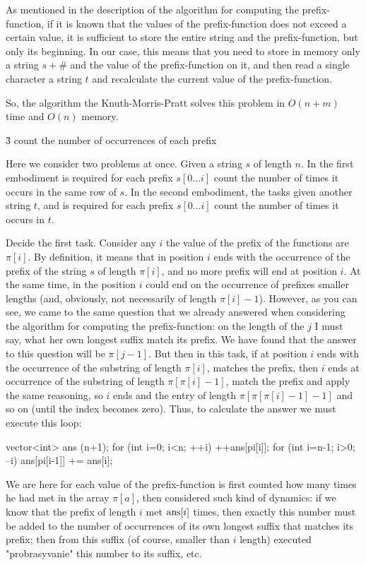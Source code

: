 As mentioned in the description of the algorithm for computing the prefix-function, if it is known that the values of the prefix-function does not exceed a certain value, it is sufficient to store the entire string and the prefix-function, but only its beginning. In our case, this means that you need to store in memory only a string $s + \#$ and the value of the prefix-function on it, and then read a single character a string $t$ and recalculate the current value of the prefix-function.

So, the algorithm the Knuth-Morris-Pratt solves this problem in $O(n+m)$ time and $O(n)$ memory.


\h3{ count the number of occurrences of each prefix }

Here we consider two problems at once. Given a string $s$ of length $n$. In the first embodiment is required for each prefix $s[0 \ldots i]$ count the number of times it occurs in the same row of $s$. In the second embodiment, the tasks given another string $t$, and is required for each prefix $s[0 \ldots i]$ count the number of times it occurs in $t$.

Decide the first task. Consider any $i$ the value of the prefix of the functions are $\pi[i]$. By definition, it means that in position $i$ ends with the occurrence of the prefix of the string $s$ of length $\pi[i]$, and no more prefix will end at position $i$. At the same time, in the position $i$ could end on the occurrence of prefixes smaller lengths (and, obviously, not necessarily of length $\pi[i]-1$). However, as you can see, we came to the same question that we already answered when considering the algorithm for computing the prefix-function: on the length of the $j$ I must say, what her own longest suffix match its prefix. We have found that the answer to this question will be $\pi[j-1]$. But then in this task, if at position $i$ ends with the occurrence of the substring of length $\pi[i]$, matches the prefix, then $i$ ends at occurrence of the substring of length $\pi[\pi[i]-1]$, match the prefix and apply the same reasoning, so $i$ ends and the entry of length $\pi[\pi[\pi[i]-1]-1]$ and so on (until the index becomes zero). Thus, to calculate the answer we must execute this loop:

\code
vector<int> ans (n+1);
for (int i=0; i<n; ++i)
++ans[pi[i]];
for (int i=n-1; i>0; --i)
ans[pi[i-1]] += ans[i];
\endcode

We are here for each value of the prefix-function is first counted how many times he had met in the array $\pi [a]$, then considered such kind of dynamics: if we know that the prefix of length $i$ met ${\rm ans}[i]$ times, then exactly this number must be added to the number of occurrences of its own longest suffix that matches its prefix; then from this suffix (of course, smaller than $i$ length) executed "probrasyvanie" this number to its suffix, etc.

